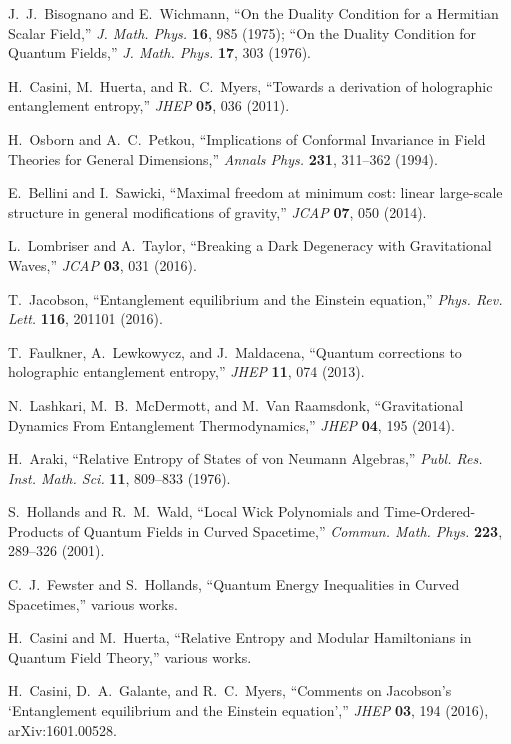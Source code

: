 \documentclass[aps,prd,onecolumn,superscriptaddress,nofootinbib]{revtex4-2}
\begin{document}

\begin{thebibliography}{99}

J.~J.~Bisognano and E.~Wichmann,
``On the Duality Condition for a Hermitian Scalar Field,'' \emph{J. Math. Phys.} \textbf{16}, 985 (1975);
``On the Duality Condition for Quantum Fields,'' \emph{J. Math. Phys.} \textbf{17}, 303 (1976).

H.~Casini, M.~Huerta, and R.~C.~Myers,
``Towards a derivation of holographic entanglement entropy,''
\emph{JHEP} \textbf{05}, 036 (2011).

H.~Osborn and A.~C.~Petkou,
``Implications of Conformal Invariance in Field Theories for General Dimensions,''
\emph{Annals Phys.} \textbf{231}, 311–362 (1994).

E.~Bellini and I.~Sawicki,
``Maximal freedom at minimum cost: linear large-scale structure in general modifications of gravity,''
\emph{JCAP} \textbf{07}, 050 (2014).

L.~Lombriser and A.~Taylor,
``Breaking a Dark Degeneracy with Gravitational Waves,''
\emph{JCAP} \textbf{03}, 031 (2016).

T.~Jacobson,
``Entanglement equilibrium and the Einstein equation,''
\emph{Phys. Rev. Lett.} \textbf{116}, 201101 (2016).

T.~Faulkner, A.~Lewkowycz, and J.~Maldacena,
``Quantum corrections to holographic entanglement entropy,''
\emph{JHEP} \textbf{11}, 074 (2013).

N.~Lashkari, M.~B.~McDermott, and M.~Van Raamsdonk,
``Gravitational Dynamics From Entanglement Thermodynamics,''
\emph{JHEP} \textbf{04}, 195 (2014).

H.~Araki, ``Relative Entropy of States of von Neumann Algebras,''
\emph{Publ. Res. Inst. Math. Sci.} \textbf{11}, 809–833 (1976).

S.~Hollands and R.~M.~Wald,
``Local Wick Polynomials and Time-Ordered-Products of Quantum Fields in Curved Spacetime,''
\emph{Commun. Math. Phys.} \textbf{223}, 289–326 (2001).

C.~J.~Fewster and S.~Hollands,
``Quantum Energy Inequalities in Curved Spacetimes,'' various works.

H.~Casini and M.~Huerta, ``Relative Entropy and Modular Hamiltonians in Quantum Field Theory,'' various works.

H.~Casini, D.~A.~Galante, and R.~C.~Myers,
``Comments on Jacobson's `Entanglement equilibrium and the Einstein equation',''
\emph{JHEP} \textbf{03}, 194 (2016), arXiv:1601.00528.

\end{thebibliography}
\end{document}
